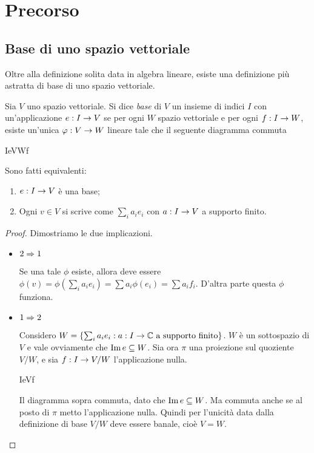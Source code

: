 \section{Precorso}

\subsection{Base di uno spazio vettoriale}
  Oltre alla definizione solita data in algebra lineare, esiste una definizione più astratta di base di uno spazio vettoriale.
  \begin{mydef}
    Sia $V$ uno spazio vettoriale. Si dice \emph{base} di $V$ un insieme di indici $I$ con un'applicazione $e: I \rightarrow V$ se per ogni $W$ spazio vettoriale e per ogni $f: I \rightarrow W$, esiste un'unica $\varphi: V \rightarrow W$ lineare tale che il seguente diagramma commuta

    	\tridiag IeV\phi Wf

  \end{mydef}

  \begin{myprop}
    Sono fatti equivalenti:
    \begin{enumerate}
    \item $e: I \rightarrow V$ è una base;
    \item Ogni $v \in V$ si scrive come $\sum_i a_ie_i$ con $a: I\rightarrow V$ a supporto finito. 
    \end{enumerate}
  \end{myprop}
  \begin{proof}
    Dimostriamo le due implicazioni.
    \begin{itemize}
      \item $2\Rightarrow 1$
      
      Se una tale $\phi$ esiste, allora deve essere $\phi(v)=\phi(\sum_i a_i e_i) = \sum a_i \phi(e_i) = \sum a_i f_i$. D'altra parte questa $\phi$ funziona.
      
      \item $1 \Rightarrow 2$
      
      Considero $W = \{\sum_i a_ie_i : a:I\rightarrow \mathbb C \mbox{ a supporto finito}\}$. $W$ è un sottospazio di $V$ e vale ovviamente che $\operatorname{Im} e \subseteq W$. Sia ora $\pi$ una proiezione sul quoziente $V/W$, e sia $f: I \rightarrow V/W$ l'applicazione nulla.
	
	\tridiag IeVf
      
      Il diagramma sopra commuta, dato che $\operatorname{Im} e \subseteq W$. Ma commuta anche se al posto di $\pi$ metto l'applicazione nulla. Quindi per l'unicità data dalla definizione di base $V/W$ deve essere banale, cioè $V=W$.
    \end{itemize}
  \end{proof}
  
